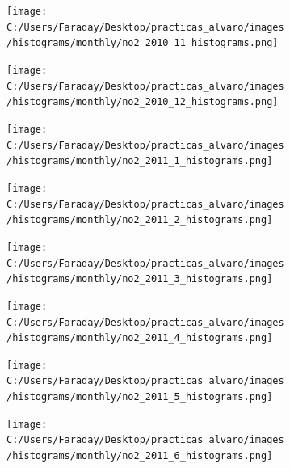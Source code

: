 \documentclass[12pt]{article}
\begin{document}
\begin{figure}[H]
\centering
\begin{subfigure}[h]{0.45\textwidth}
\texttt{[image: C:/Users/Faraday/Desktop/practicas\_alvaro/images/histograms/monthly/no2\_2010\_11\_histograms.png]}
\caption{}
\label{fig:hist-mon-1-11-2010}
\end{subfigure}
%
\begin{subfigure}[H]{0.45\textwidth}
\texttt{[image: C:/Users/Faraday/Desktop/practicas\_alvaro/images/histograms/monthly/no2\_2010\_12\_histograms.png]}
\caption{}
\label{fig:hist-mon-1-12-2010}
\end{subfigure}
\caption{}
\end{figure}

\newpage

\begin{figure}[H]
\centering
\begin{subfigure}[h]{0.45\textwidth}
\texttt{[image: C:/Users/Faraday/Desktop/practicas\_alvaro/images/histograms/monthly/no2\_2011\_1\_histograms.png]}
\caption{}
\label{fig:hist-mon-1-1-2011}
\end{subfigure}
%
\begin{subfigure}[H]{0.45\textwidth}
\texttt{[image: C:/Users/Faraday/Desktop/practicas\_alvaro/images/histograms/monthly/no2\_2011\_2\_histograms.png]}
\caption{}
\label{fig:hist-mon-1-2-2011}
\end{subfigure}
\caption{}
\end{figure}

\begin{figure}[H]
\centering
\begin{subfigure}[h]{0.45\textwidth}
\texttt{[image: C:/Users/Faraday/Desktop/practicas\_alvaro/images/histograms/monthly/no2\_2011\_3\_histograms.png]}
\caption{}
\label{fig:hist-mon-1-3-2011}
\end{subfigure}
%
\begin{subfigure}[H]{0.45\textwidth}
\texttt{[image: C:/Users/Faraday/Desktop/practicas\_alvaro/images/histograms/monthly/no2\_2011\_4\_histograms.png]}
\caption{}
\label{fig:hist-mon-1-4-2011}
\end{subfigure}
\caption{}
\end{figure}

\begin{figure}[H]
\centering
\begin{subfigure}[h]{0.45\textwidth}
\texttt{[image: C:/Users/Faraday/Desktop/practicas\_alvaro/images/histograms/monthly/no2\_2011\_5\_histograms.png]}
\caption{}
\label{fig:hist-mon-1-5-2011}
\end{subfigure}
%
\begin{subfigure}[H]{0.45\textwidth}
\texttt{[image: C:/Users/Faraday/Desktop/practicas\_alvaro/images/histograms/monthly/no2\_2011\_6\_histograms.png]}
\caption{}
\label{fig:hist-mon-1-6-2011}
\end{subfigure}
\caption{}
\end{figure}
\end{document}
